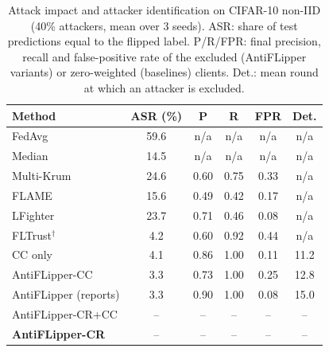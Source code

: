 \begin{table}[t]
\centering
\caption{Attack impact and attacker identification on CIFAR-10 non-IID (40\% attackers, mean over 3 seeds). ASR: share of test predictions equal to the flipped label. P/R/FPR: final precision, recall and false-positive rate of the excluded (AntiFLipper variants) or zero-weighted (baselines) clients. Det.: mean round at which an attacker is excluded.}
\label{tab:detection}
\renewcommand{\arraystretch}{1.1}
\footnotesize
\setlength{\tabcolsep}{3.5pt}
\begin{tabular}{l|c|ccc|c}
\hline
\textbf{Method} & \textbf{ASR (\%)} & \textbf{P} & \textbf{R} & \textbf{FPR} & \textbf{Det.} \\
\hline
FedAvg & 59.6 & n/a & n/a & n/a & n/a \\
Median & 14.5 & n/a & n/a & n/a & n/a \\
Multi-Krum & 24.6 & 0.60 & 0.75 & 0.33 & n/a \\
FLAME & 15.6 & 0.49 & 0.42 & 0.17 & n/a \\
LFighter & 23.7 & 0.71 & 0.46 & 0.08 & n/a \\
FLTrust$^\dagger$ & 4.2 & 0.60 & 0.92 & 0.44 & n/a \\
CC only & 4.1 & 0.86 & 1.00 & 0.11 & 11.2 \\
AntiFLipper-CC & 3.3 & 0.73 & 1.00 & 0.25 & 12.8 \\
AntiFLipper (reports) & 3.3 & 0.90 & 1.00 & 0.08 & 15.0 \\
AntiFLipper-CR+CC & -- & -- & -- & -- & -- \\
\textbf{AntiFLipper-CR} & -- & -- & -- & -- & -- \\
\hline
\end{tabular}
\end{table}
